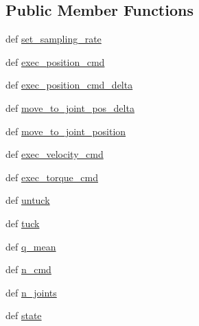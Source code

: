 \subsection*{Public Member Functions}
\begin{DoxyCompactItemize}
\item 
def \hyperlink{classaml__robot_1_1robot__interface_1_1_robot_interface_ab1b86191878c91e041f63affb052a233}{set\-\_\-sampling\-\_\-rate}
\item 
def \hyperlink{classaml__robot_1_1robot__interface_1_1_robot_interface_a00bb286106b067c786642430026d0ea8}{exec\-\_\-position\-\_\-cmd}
\item 
def \hyperlink{classaml__robot_1_1robot__interface_1_1_robot_interface_a0c47fbc4b8a2a29727606b9bd4331fdc}{exec\-\_\-position\-\_\-cmd\-\_\-delta}
\item 
def \hyperlink{classaml__robot_1_1robot__interface_1_1_robot_interface_a22eced2db066966c126a6e542f8633ca}{move\-\_\-to\-\_\-joint\-\_\-pos\-\_\-delta}
\item 
def \hyperlink{classaml__robot_1_1robot__interface_1_1_robot_interface_a4a551823396bea099ab4668fe2f170d5}{move\-\_\-to\-\_\-joint\-\_\-position}
\item 
def \hyperlink{classaml__robot_1_1robot__interface_1_1_robot_interface_a4211ad0f49662521a5eabb3f4a40722c}{exec\-\_\-velocity\-\_\-cmd}
\item 
def \hyperlink{classaml__robot_1_1robot__interface_1_1_robot_interface_a00cbed149e8561120bc2c577509b9891}{exec\-\_\-torque\-\_\-cmd}
\item 
def \hyperlink{classaml__robot_1_1robot__interface_1_1_robot_interface_a32a4aa755c2bf9c15338c60c723dfce2}{untuck}
\item 
def \hyperlink{classaml__robot_1_1robot__interface_1_1_robot_interface_ae425c5a51fe2ffc43266a32e23c9e429}{tuck}
\item 
def \hyperlink{classaml__robot_1_1robot__interface_1_1_robot_interface_aec63f22964e9744e8d9f0816a4aff1a9}{q\-\_\-mean}
\item 
def \hyperlink{classaml__robot_1_1robot__interface_1_1_robot_interface_a1b893df5dedb1834963314ffc875e1e4}{n\-\_\-cmd}
\item 
def \hyperlink{classaml__robot_1_1robot__interface_1_1_robot_interface_a097ae8ee6dfc58e13ba4046873583494}{n\-\_\-joints}
\item 
def \hyperlink{classaml__robot_1_1robot__interface_1_1_robot_interface_afa3889d562ac8942e3da7065c9ee6cfe}{state}
\item 

\end{DoxyCompactItemize}
